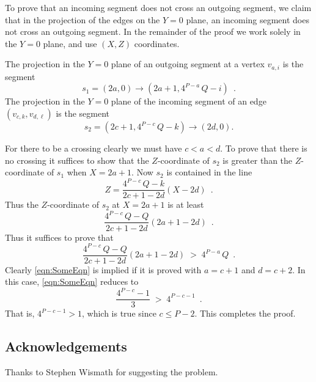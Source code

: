 \documentclass[a4paper]{article}
\newcommand{\eqnlabel}[1]{\label{eqn:#1}}
\newcommand{\eqnref}[1]{\eqref{eqn:#1}}
\theoremstyle{plain}
\begin{document}
To prove that an incoming segment does not cross an outgoing segment, we claim
that in the projection of the edges on the $Y=0$ plane,  an incoming segment
does not cross an outgoing segment. In the remainder of the proof we work
solely in the $Y=0$ plane, and use $(X,Z)$ coordinates.

The projection in the $Y=0$ plane 
of an outgoing segment at a vertex $v_{a,i}$  is the segment 
\begin{equation*}
s_1=(2a,0)\rightarrow(2a+1,4^{P-a}\,Q-i)\enspace.
\end{equation*}
The projection in the $Y=0$ plane of the incoming segment of an edge
$(v_{c,k},v_{d,\ell})$  is the segment
\begin{equation*}
s_2=(2c+1,4^{P-c}\,Q-k)\rightarrow(2d,0).
\end{equation*}

For there to be a crossing clearly we must have $c<a<d$. To prove that there is
no crossing it suffices to show that the $Z$-coordinate of $s_2$ is greater
than the $Z$-coordinate of $s_1$ when $X=2a+1$.
Now $s_2$ is contained in the line 
\begin{equation*}
Z=\frac{4^{P-c}\,Q-k}{2c+1-2d}(X-2d)\enspace.
\end{equation*}
Thus the $Z$-coordinate of $s_2$ at $X=2a+1$ is at least
\begin{equation*}
\frac{4^{P-c}\,Q-Q}{2c+1-2d}(2a+1-2d)\enspace.
\end{equation*}
Thus it suffices to prove that 
\begin{equation}
\eqnlabel{SomeEqn}
\frac{4^{P-c}\,Q-Q}{2c+1-2d}(2a+1-2d)\;>\;4^{P-a}\,Q\enspace.
\end{equation}
Clearly \eqnref{SomeEqn} is implied if it is proved with $a=c+1$ and $d=c+2$.
In this case, \eqnref{SomeEqn} reduces to
\begin{equation*}
\frac{4^{P-c}-1}{3}\;>\;4^{P-c-1}\enspace.
\end{equation*}
That is,
$4^{P-c-1}>1$,
which is true since $c\leq P-2$.
This completes the proof.


\subsection*{Acknowledgements}

Thanks to Stephen Wismath for suggesting the problem.
\end{document}
